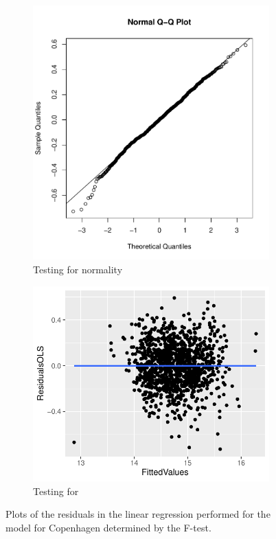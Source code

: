 \begin{figure}[H]
\centering
\begin{subfigure}[b]{0.5\textwidth}
    \centering
    \includegraphics[width = 1 \textwidth]{figures/denheryesyeysyes.pdf}
    \caption{Testing for normality}
    \label{fig:F_chp_resu}
\end{subfigure}%
\begin{subfigure}[b]{0.5\textwidth}
\centering
    \includegraphics[width = 1 \textwidth]{figures/RplotDenHerHejhej.pdf}
    \caption{Testing for \hetero}
    \label{fig:F_chp_hetero}
\end{subfigure}
\caption{Plots of the residuals in the linear regression performed for the model for Copenhagen determined by the F-test.}
\label{fig:F_cph_plot}
\end{figure}

